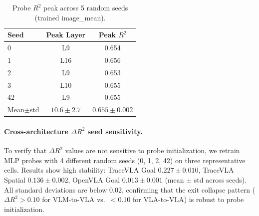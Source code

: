 \begin{table}[h]
\centering
\caption{Probe $R^2$ peak across 5 random seeds (trained image\_mean).}
\label{tab:seed_sensitivity}
\small
\begin{tabular}{lcc}
\toprule
\textbf{Seed} & \textbf{Peak Layer} & \textbf{Peak $R^2$} \\
\midrule
0 & L9 & 0.654 \\
1 & L16 & 0.656 \\
2 & L9 & 0.653 \\
3 & L10 & 0.655 \\
42 & L9 & 0.655 \\
\midrule
Mean$\pm$std & $10.6\pm2.7$ & $0.655\pm0.002$ \\
\bottomrule
\end{tabular}
\end{table}

\paragraph{Cross-architecture $\Delta R^2$ seed sensitivity.}
To verify that $\Delta R^2$ values are not sensitive to probe initialization, we retrain MLP probes with 4 different random seeds (0, 1, 2, 42) on three representative cells.
Results show high stability: TraceVLA Goal $0.227 \pm 0.010$, TraceVLA Spatial $0.136 \pm 0.002$, OpenVLA Goal $0.013 \pm 0.001$ (mean $\pm$ std across seeds).
All standard deviations are below 0.02, confirming that the exit collapse pattern ($\Delta R^2 > 0.10$ for VLM-to-VLA vs.\ $< 0.10$ for VLA-to-VLA) is robust to probe initialization.

